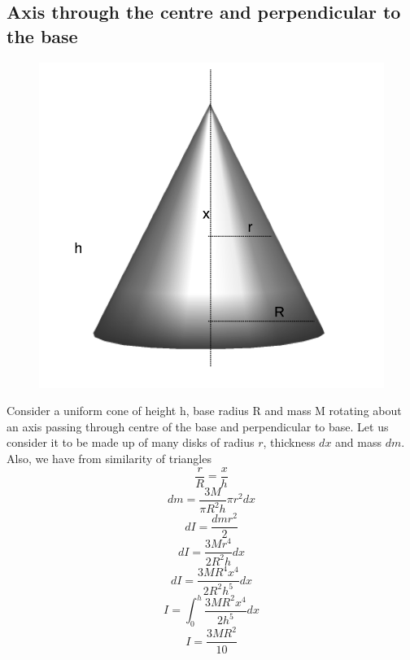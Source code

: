 \documentclass{article}
\begin{document}
\subsection{Axis through the centre and perpendicular to the base}
\begin{figure}[h!]
  \centering
  \includegraphics[scale=0.3]{cone1.png}
\end{figure}
Consider a uniform cone of height h, base radius R and mass M rotating about an axis passing through centre of the base and perpendicular to base.
Let us consider it to be made up of many disks of radius $r$, thickness $dx$ and mass $dm$. Also, we have from similarity of triangles
$$\frac{r}{R} = \frac{x}{h}$$
$$dm = \frac{3M}{\pi R^2h} \pi r^2 dx$$
$$dI = \frac{dmr^2}{2}$$
$$dI = \frac{3Mr^4}{2R^2h} dx$$
$$dI = \frac{3MR^4x^4}{2R^2h^5} dx$$
$$I = \int_0^h \frac{3MR^2x^4}{2h^5} dx$$
$$\boxed{I = \frac{3MR^2}{10}}$$
\end{document}
